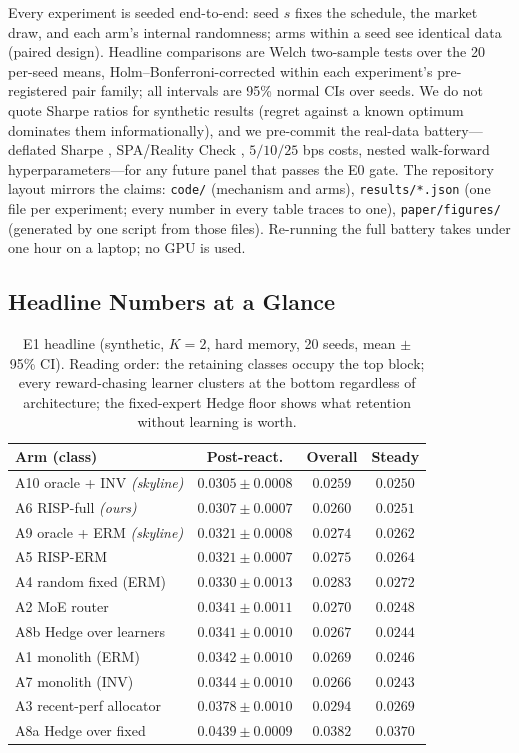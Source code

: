 \documentclass[10pt]{article}
\newcommand{\nm}{\textsc{RISP}}
\begin{document}
Every experiment is seeded end-to-end: seed $s$ fixes the schedule, the
market draw, and each arm's internal randomness; arms within a seed see
identical data (paired design). Headline comparisons are Welch
two-sample tests over the 20 per-seed means, Holm--Bonferroni-corrected
within each experiment's pre-registered pair family; all intervals are
95\% normal CIs over seeds. We do not quote Sharpe ratios for synthetic
results (regret against a known optimum dominates them informationally),
and we pre-commit the real-data battery---deflated Sharpe
\cite{bailey2014deflated}, SPA/Reality Check \cite{hansen2005spa,
white2000reality}, $5/10/25$ bps costs, nested walk-forward
hyperparameters---for any future panel that passes the E0 gate. The
repository layout mirrors the claims: \texttt{code/} (mechanism and
arms), \texttt{results/*.json} (one file per experiment; every number in
every table traces to one), \texttt{paper/figures/} (generated by one
script from those files). Re-running the full battery takes under one
hour on a laptop; no GPU is used.

\subsection{Headline Numbers at a Glance}

\begin{table}[h]
\centering
\small
\begin{tabular}{lccc}
\toprule
\textbf{Arm (class)} & \textbf{Post-react.} & \textbf{Overall} & \textbf{Steady} \\
\midrule
A10 oracle + INV \emph{(skyline)} & $0.0305 \pm 0.0008$ & $0.0259$ & $0.0250$ \\
A6 \nm{}-full \emph{(ours)} & $\mathbf{0.0307 \pm 0.0007}$ & $0.0260$ & $0.0251$ \\
A9 oracle + ERM \emph{(skyline)} & $0.0321 \pm 0.0008$ & $0.0274$ & $0.0262$ \\
A5 \nm{}-ERM & $0.0321 \pm 0.0007$ & $0.0275$ & $0.0264$ \\
A4 random fixed (ERM) & $0.0330 \pm 0.0013$ & $0.0283$ & $0.0272$ \\
A2 MoE router & $0.0341 \pm 0.0011$ & $0.0270$ & $0.0248$ \\
A8b Hedge over learners & $0.0341 \pm 0.0010$ & $0.0267$ & $0.0244$ \\
A1 monolith (ERM) & $0.0342 \pm 0.0010$ & $0.0269$ & $0.0246$ \\
A7 monolith (INV) & $0.0344 \pm 0.0010$ & $0.0266$ & $0.0243$ \\
A3 recent-perf allocator & $0.0378 \pm 0.0010$ & $0.0294$ & $0.0269$ \\
A8a Hedge over fixed & $0.0439 \pm 0.0009$ & $0.0382$ & $0.0370$ \\
\bottomrule
\end{tabular}
\caption{E1 headline (synthetic, $K{=}2$, hard memory, 20 seeds, mean
$\pm$ 95\% CI). Reading order: the retaining classes occupy the top
block; every reward-chasing learner clusters at the bottom regardless of
architecture; the fixed-expert Hedge floor shows what retention without
learning is worth.}
\label{tab:exp-headline}
\end{table}
\end{document}
